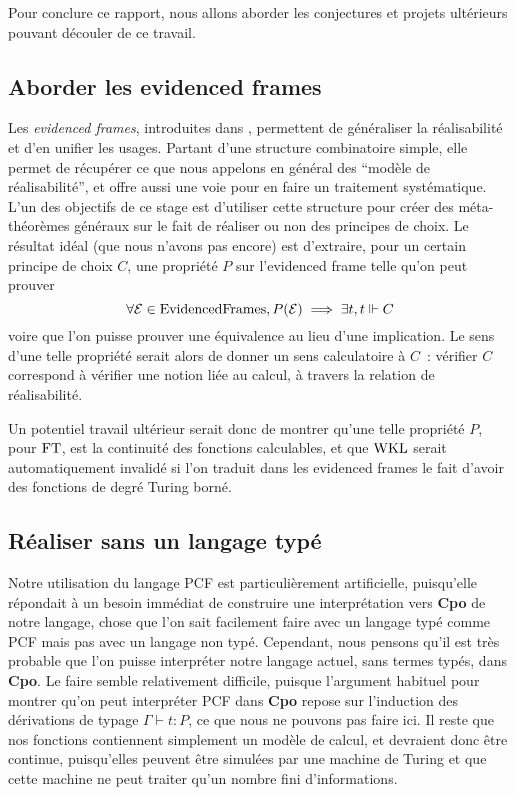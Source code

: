 \documentclass{article}
\begin{document}
Pour conclure ce rapport, nous allons aborder les conjectures et projets ultérieurs pouvant découler de ce travail.

\subsection{Aborder les evidenced frames}

Les \textit{evidenced frames}, introduites dans \cite{DBLP:conf/lics/0001MT21}, permettent de généraliser la réalisabilité et d'en unifier les usages. Partant d'une structure combinatoire simple, elle permet de récupérer ce que nous appelons en général des ``modèle de réalisabilité'', et offre aussi une voie pour en faire un traitement systématique. L'un des objectifs de ce stage est d'utiliser cette structure pour créer des méta-théorèmes généraux sur le fait de réaliser ou non des principes de choix. Le résultat idéal (que nous n'avons pas encore) est d'extraire, pour un certain principe de choix $C$, une propriété $P$ sur l'evidenced frame telle qu'on peut prouver
\[\forall \mathcal E \in \mathrm{Evidenced Frames}, P(\mathcal E) \implies \exists t, t\Vdash C\]
voire que l'on puisse prouver une équivalence au lieu d'une implication. Le sens d'une telle propriété serait alors de donner un sens calculatoire à $C$~: vérifier $C$ correspond à vérifier une notion liée au calcul, à travers la relation de réalisabilité.

Un potentiel travail ultérieur serait donc de montrer qu'une telle propriété $P$, pour $\mathrm{FT}$, est la continuité des fonctions calculables, et que $\mathrm{WKL}$ serait automatiquement invalidé si l'on traduit dans les evidenced frames le fait d'avoir des fonctions de degré Turing borné.

\subsection{Réaliser sans un langage typé}

Notre utilisation du langage PCF est particulièrement artificielle, puisqu'elle répondait à un besoin immédiat de construire une interprétation vers \textbf{Cpo} de notre langage, chose que l'on sait facilement faire avec un langage typé comme PCF mais pas avec un langage non typé. Cependant, nous pensons qu'il est très probable que l'on puisse interpréter notre langage actuel, sans termes typés, dans \textbf{Cpo}. Le faire semble relativement difficile, puisque l'argument habituel pour montrer qu'on peut interpréter PCF dans \textbf{Cpo} repose sur l'induction des dérivations de typage $\Gamma\vdash t : P$, ce que nous ne pouvons pas faire ici. Il reste que nos fonctions contiennent simplement un modèle de calcul, et devraient donc être continue, puisqu'elles peuvent être simulées par une machine de Turing et que cette machine ne peut traiter qu'un nombre fini d'informations.
\end{document}
